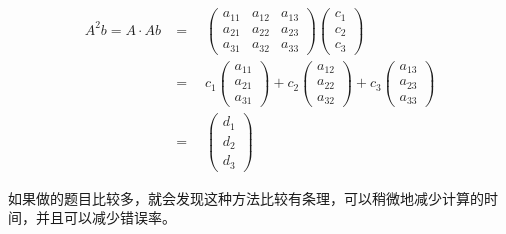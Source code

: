 \documentclass{ctexart}
\begin{document}
\begin{equation}
    \begin{aligned}
        A^2b = A \cdot Ab & = \quad
        \begin{pmatrix}
            a_{11} & a_{12} & a_{13} \\
            a_{21} & a_{22} & a_{23} \\
            a_{31} & a_{32} & a_{33}
        \end{pmatrix}
        \begin{pmatrix}
            c_{1} \\
            c_{2} \\
            c_{3}
        \end{pmatrix}                                \\
                                            & = \quad
        c_{1}
        \begin{pmatrix}
            a_{11} \\
            a_{21} \\
            a_{31}
        \end{pmatrix}
        +
        c_{2}
        \begin{pmatrix}
            a_{12} \\
            a_{22} \\
            a_{32}
        \end{pmatrix}
        +
        c_{3}
        \begin{pmatrix}
            a_{13} \\
            a_{23} \\
            a_{33}
        \end{pmatrix}                                \\
                                            & = \quad
        \begin{pmatrix}
            d_1 \\
            d_2 \\
            d_3
        \end{pmatrix}
        \label{eq:4}
    \end{aligned}
\end{equation}

如果做的题目比较多，就会发现这种方法比较有条理，可以稍微地减少计算的时间，并且可以减少错误率。
\end{document}
